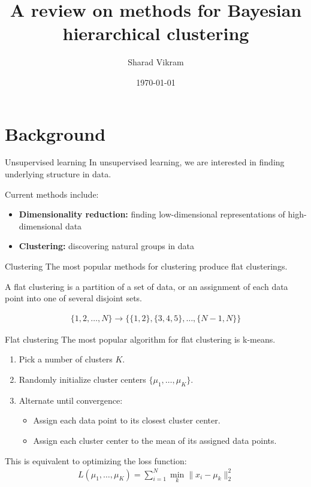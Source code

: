 \documentclass[10pt, compress]{beamer}
\title{A review on methods for Bayesian hierarchical clustering}
\subtitle{}
\date{\today}
\author{Sharad Vikram}
\institute{UCSD}
\begin{document}
\maketitle

\section{Background}

\begin{frame}{Unsupervised learning}
  In unsupervised learning, we are interested in finding
        underlying structure
        in data.

  Current methods include:
  \begin{itemize}
    \item<2-> \textbf{Dimensionality reduction:} finding low-dimensional
      representations of high-dimensional data
    \item<3-> \textbf{Clustering:} discovering natural groups
      in data
  \end{itemize}
\end{frame}

\begin{frame}{Clustering}
  The most popular methods for clustering produce
  flat clusterings.

  A \alert{flat clustering} is a partition of a set of data,
  or an assignment of each data point into one of
  several disjoint sets.

  \begin{align}
    \{1, 2, \ldots, N\} \rightarrow \{\{1,2\}, \{3, 4, 5\}, \ldots, \{N - 1, N\}\}
  \end{align}
\end{frame}

\begin{frame}{Flat clustering}
  The most popular algorithm for flat clustering is \alert{k-means}.
  \begin{enumerate}
    \item<2-> Pick a number of clusters $K$.
    \item<3-> Randomly initialize cluster centers $\{\mu_1, \ldots, \mu_K\}$.
    \item<4-> Alternate until convergence:
      \begin{itemize}
        \item Assign each data point to its closest cluster center.
        \item Assign each cluster center to the mean of its assigned data points.
      \end{itemize}
  \end{enumerate}
  This is equivalent to optimizing the loss function:
  \begin{align}
    L(\mu_1, \ldots, \mu_K) = \sum_{i = 1}^N \min_k \|x_i - \mu_k\|^2_2
  \end{align}
\end{frame}
\end{document}
